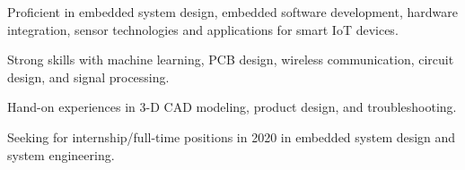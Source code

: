 

\begin{cvparagraph}

    \vspace{12pt}
\begin{cvitems}
    \setlength{\itemsep}{2pt}
    \item Proficient in embedded system design, embedded software development, hardware integration, sensor technologies and applications for smart IoT devices.
    \item Strong skills with machine learning, PCB design, wireless communication, circuit design, and signal processing.
    \item Hand-on experiences in 3-D CAD modeling, product design, and troubleshooting.
    \item Seeking for internship/full-time positions in 2020 in embedded system design and system engineering.
\end{cvitems}
\end{cvparagraph}
